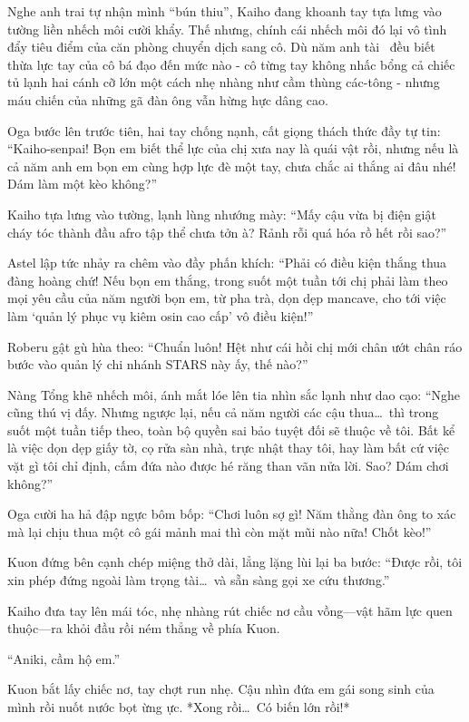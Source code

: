 \documentclass[../main.tex]{subfiles}
\begin{document}
Nghe anh trai tự nhận mình ``bún thiu'', Kaiho đang khoanh tay tựa lưng vào tường liền nhếch môi cười khẩy. Thế nhưng, chính cái nhếch môi đó lại vô tình đẩy tiêu điểm của căn phòng chuyển dịch sang cô. Dù năm anh tài \hls\ đều biết thừa lực tay của cô bá đạo đến mức nào - cô từng tay không nhấc bổng cả chiếc tủ lạnh hai cánh cỡ lớn một cách nhẹ nhàng như cầm thùng các-tông - nhưng máu chiến của những gã đàn ông vẫn hừng hực dâng cao.

Oga bước lên trước tiên, hai tay chống nạnh, cất giọng thách thức đầy tự tin: ``Kaiho-senpai! Bọn em biết thể lực của chị xưa nay là quái vật rồi, nhưng nếu là cả năm anh em bọn em cùng hợp lực đè một tay, chưa chắc ai thắng ai đâu nhé! Dám làm một kèo không?''

Kaiho tựa lưng vào tường, lạnh lùng nhướng mày: ``Mấy cậu vừa bị điện giật cháy tóc thành đầu afro tập thể chưa tởn à? Rảnh rỗi quá hóa rồ hết rồi sao?''

Astel lập tức nhảy ra chêm vào đầy phấn khích: ``Phải có điều kiện thắng thua đàng hoàng chứ! Nếu bọn em thắng, trong suốt một tuần tới chị phải làm theo mọi yêu cầu của năm người bọn em, từ pha trà, dọn dẹp mancave, cho tới việc làm `quản lý phục vụ kiêm osin cao cấp' vô điều kiện!''

Roberu gật gù hùa theo: ``Chuẩn luôn! Hệt như cái hồi chị mới chân ướt chân ráo bước vào quản lý chi nhánh STARS này ấy, thế nào?''

Nàng Tổng khẽ nhếch môi, ánh mắt lóe lên tia nhìn sắc lạnh như dao cạo: ``Nghe cũng thú vị đấy. Nhưng ngược lại, nếu cả năm người các cậu thua\dots\ thì trong suốt một tuần tiếp theo, toàn bộ quyền sai bảo tuyệt đối sẽ thuộc về tôi. Bất kể là việc dọn dẹp giấy tờ, cọ rửa sàn nhà, trực nhật thay tôi, hay làm bất cứ việc vặt gì tôi chỉ định, cấm đứa nào được hé răng than vãn nửa lời. Sao? Dám chơi không?''

Oga cười ha hả đập ngực bôm bốp: ``Chơi luôn sợ gì! Năm thằng đàn ông to xác mà lại chịu thua một cô gái mảnh mai thì còn mặt mũi nào nữa! Chốt kèo!''

Kuon đứng bên cạnh chép miệng thở dài, lẳng lặng lùi lại ba bước: ``Được rồi, tôi xin phép đứng ngoài làm trọng tài\dots\ và sẵn sàng gọi xe cứu thương.''

Kaiho đưa tay lên mái tóc, nhẹ nhàng rút chiếc nơ cầu vồng—vật hãm lực quen thuộc—ra khỏi đầu rồi ném thẳng về phía Kuon.

``Aniki, cầm hộ em.''

Kuon bắt lấy chiếc nơ, tay chợt run nhẹ. Cậu nhìn đứa em gái song sinh của mình rồi nuốt nước bọt ừng ực. *Xong rồi\dots\ Có biến lớn rồi!*
\end{document}
